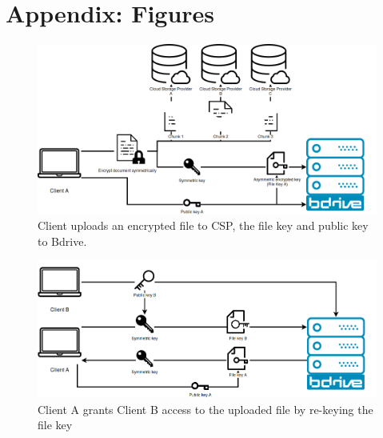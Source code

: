 \documentclass[twocolumn]{article}
\begin{document}
\section{Appendix: Figures}
\begin{figure}[!ht]
\centering
    \includegraphics[width=0.8\linewidth]{img/bdrive1.png}\par 
    \caption{Client uploads an encrypted file to CSP, the file key and public key to Bdrive.}
    \label{fig:filekey}
\end{figure}
\begin{figure}[!ht]
\centering
    \includegraphics[width=0.8\linewidth]{img/bdrive2.png}\par
    \caption{Client A grants Client B access to the uploaded file by re-keying the file key}
    \label{fig:rekey}
\end{figure}

\end{document}
